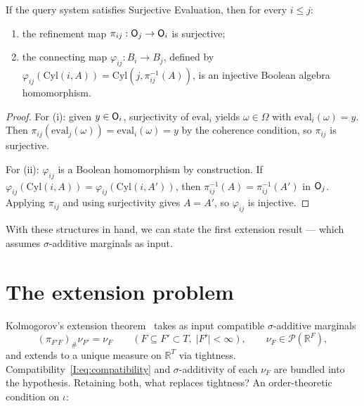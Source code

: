 \begin{lemma}
\label{I:lem:surj-inj}
If the query system satisfies Surjective Evaluation, then for every $i \leq j$:
\begin{enumerate}[label=(\roman*)]
  \item the refinement map $\pi_{ij} : \mathsf{O}_{j} \to \mathsf{O}_{i}$ is surjective;
  \item the connecting map $\varphi_{ij} : B_i \to B_j$, defined by $\varphi_{ij}(\mathrm{Cyl}(i,A)) = \mathrm{Cyl}(j, \pi_{ij}^{-1}(A))$, is an injective Boolean algebra homomorphism.
\end{enumerate}
\end{lemma}

\begin{proof}
For (i): given $y \in \mathsf{O}_{i}$, surjectivity of $\mathrm{eval}_i$ yields $\omega \in \Omega$ with $\mathrm{eval}_i(\omega) = y$. Then $\pi_{ij}(\mathrm{eval}_j(\omega)) = \mathrm{eval}_i(\omega) = y$ by the coherence condition, so $\pi_{ij}$ is surjective.

For (ii): $\varphi_{ij}$ is a Boolean homomorphism by construction. If $\varphi_{ij}(\mathrm{Cyl}(i,A)) = \varphi_{ij}(\mathrm{Cyl}(i,A'))$, then $\pi_{ij}^{-1}(A) = \pi_{ij}^{-1}(A')$ in $\mathsf{O}_{j}$. Applying $\pi_{ij}$ and using surjectivity gives $A = A'$, so $\varphi_{ij}$ is injective.
\end{proof}

\noindent With these structures in hand, we can state the first
extension result --- which assumes $\sigma$-additive marginals as input.

\section{The extension problem}
\label{I:sec:cara}

Kolmogorov's extension theorem~\cite{Kolmogorov} takes as input
compatible $\sigma$-additive marginals
\[
  (\pi_{F'F})_\# \nu_{F'} = \nu_F
  \qquad (F \subseteq F' \subset T,\; |F'| < \infty),
  \qquad
  \nu_F \in \mathcal{P}(\mathbb{R}^F),
\]
and extends to a unique measure on $\mathbb{R}^T$ via tightness.
Compatibility~\eqref{I:eq:compatibility} and $\sigma$-additivity of
each $\nu_F$ are bundled into the hypothesis.  Retaining both, what
replaces tightness?  An order-theoretic condition on $\iota$:

